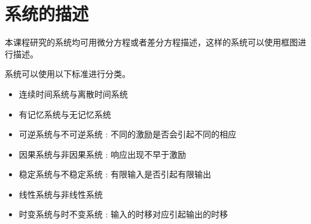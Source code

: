 \documentclass[cn,11pt,chinese,black,simple]{../elegantbook}
\begin{document}
\section{系统的描述}

本课程研究的系统均可用微分方程或者差分方程描述，这样的系统可以使用框图进行描述。

系统可以使用以下标准进行分类。

\begin{itemize}
  \item 连续时间系统与离散时间系统
  \item 有记忆系统与无记忆系统
  \item 可逆系统与不可逆系统 : 不同的激励是否会引起不同的相应
  \item 因果系统与非因果系统 : 响应出现不早于激励
  \item 稳定系统与不稳定系统 : 有限输入是否引起有限输出
  \item 线性系统与非线性系统
  \item 时变系统与时不变系统 : 输入的时移对应引起输出的时移
\end{itemize}




\ifx\mainclass\undefined
\end{document}
